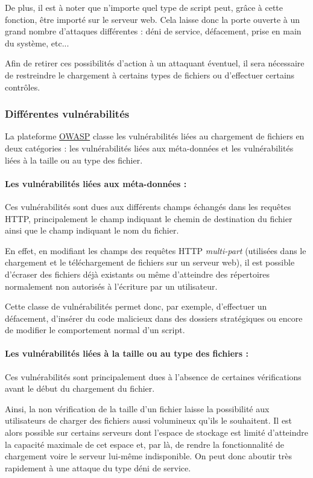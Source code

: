 De plus, il est à noter que n'importe quel type de script peut, grâce à cette fonction, être importé sur le serveur web. Cela laisse donc la porte ouverte à un grand nombre d'attaques différentes : déni de service, défacement, prise en main du système, etc...

Afin de retirer ces possibilités d'action à un attaquant éventuel, il sera nécessaire de restreindre le chargement à certains types de fichiers ou d'effectuer certains contrôles.

\subsubsection{Différentes vulnérabilités}

La plateforme \href{http://www.owasp.org}{OWASP} classe les vulnérabilités liées au chargement de fichiers en deux catégories : les vulnérabilités liées aux méta-données et les vulnérabilités liées à la taille ou au type des fichier.

\paragraph{Les vulnérabilités liées aux méta-données :}

Ces vulnérabilités sont dues aux différents champs échangés dans les requêtes HTTP, principalement le champ indiquant le chemin de destination du fichier ainsi que le champ indiquant le nom du fichier.

En effet, en modifiant les champs des requêtes HTTP \textit{multi-part} (utilisées dans le chargement et le téléchargement de fichiers sur un serveur web), il est possible d'écraser des fichiers déjà existants ou même d'atteindre des répertoires normalement non autorisés à l'écriture par un utilisateur.

Cette classe de vulnérabilités permet donc, par exemple, d'effectuer un défacement, d'insérer du code malicieux dans des dossiers stratégiques ou encore de modifier le comportement normal d'un script.

\paragraph{Les vulnérabilités liées à la taille ou au type des fichiers :}

Ces vulnérabilités sont principalement dues à l'absence de certaines vérifications avant le début du chargement du fichier. 

Ainsi, la non vérification de la taille d'un fichier laisse la possibilité aux utilisateurs de charger des fichiers aussi volumineux qu'ils le souhaitent. Il est alors possible sur certains serveurs dont l'espace de stockage est limité d'atteindre la capacité maximale de cet espace et, par là, de rendre la fonctionnalité de chargement voire le serveur lui-même indisponible. On peut donc aboutir très rapidement à une attaque du type déni de service.

